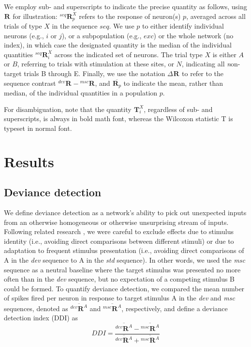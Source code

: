 \documentclass[pdflatex,referee,iicol,sn-basic]{sn-jnl}
\newcommand{\dev}{\textit{dev}}
\newcommand{\msc}{\textit{msc}}
\newcommand{\std}{\textit{std}}
\renewcommand{\R}[3][]{{}^{#1}_{}\mathbf{R}^{#2}_{#3}}
\renewcommand{\T}[3][]{{}^{#1}_{}\mathbf{T}^{#2}_{#3}}
\newcommand{\mean}[1]{\overline{#1}}
\begin{document}
We employ sub- and superscripts to indicate the precise quantity as follows, using $\R{}{}$ for illustration: $\R[seq]{X}{p}$ refers to the response of neuron(s) $p$, averaged across all trials of type $X$ in the sequence $seq$. We use $p$ to either identify individual neurons (e.g., $i$ or $j$), or a subpopulation (e.g., $exc$) or the whole network (no index), in which case the designated quantity is the median of the individual quantities $\R[seq]{X}{i}$ across the indicated set of neurons. The trial type $X$ is either $A$ or $B$, referring to trials with stimulation at these sites, or $N$, indicating all \textit{n}on-target trials B through E. Finally, we use the notation $\Delta \R{}{}$ to refer to the sequence contrast $\R[dev]{}{} - \R[msc]{}{}$, and $\mean{\R{}{p}}$ to indicate the mean, rather than median, of the individual quantities in a population $p$.

For disambiguation, note that the quantity $\T{X}{i}$, regardless of sub- and superscripts, is always in bold math font, whereas the Wilcoxon statistic T is typeset in normal font.

\section{Results}\label{sec-results}

\subsection{Deviance detection}\label{sec-dd}

We define deviance detection as a network's ability to pick out unexpected inputs from an otherwise homogeneous or otherwise unsurprising stream of inputs. Following related research \citep{Kubota2021-dx,Harms2014-ah,Jacobsen2001-sc}, we were careful to exclude effects due to stimulus identity (i.e., avoiding direct comparisons between different stimuli) or due to adaptation to frequent stimulus presentation (i.e., avoiding direct comparisons of A in the \dev{} sequence to A in the \std{} sequence). In other words, we used the \msc{} sequence as a neutral baseline where the target stimulus was presented no more often than in the \dev{} sequence, but no expectation of a competing stimulus B could be formed. To quantify deviance detection, we compared the mean number of spikes fired per neuron in response to target stimulus A in the \dev{} and \msc{} sequences, denoted as $\mean{\R[dev]{A}{}}$ and $\mean{\R[msc]{A}{}}$, respectively, and define a deviance detection index (DDI) as
\begin{equation}
    DDI = \frac{\mean{\R[dev]{A}{}} - \mean{\R[msc]{A}{}}}{\mean{\R[dev]{A}{}} + \mean{\R[msc]{A}{}}} \label{eqn-ddi}
\end{equation}
\end{document}
